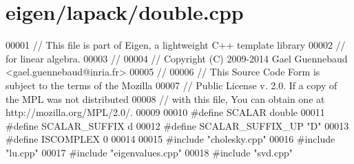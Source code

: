 \hypertarget{eigen_2lapack_2double_8cpp_source}{}\section{eigen/lapack/double.cpp}
\label{eigen_2lapack_2double_8cpp_source}

\begin{DoxyCode}
00001 \textcolor{comment}{// This file is part of Eigen, a lightweight C++ template library}
00002 \textcolor{comment}{// for linear algebra.}
00003 \textcolor{comment}{//}
00004 \textcolor{comment}{// Copyright (C) 2009-2014 Gael Guennebaud <gael.guennebaud@inria.fr>}
00005 \textcolor{comment}{//}
00006 \textcolor{comment}{// This Source Code Form is subject to the terms of the Mozilla}
00007 \textcolor{comment}{// Public License v. 2.0. If a copy of the MPL was not distributed}
00008 \textcolor{comment}{// with this file, You can obtain one at http://mozilla.org/MPL/2.0/.}
00009 
00010 \textcolor{preprocessor}{#define SCALAR        double}
00011 \textcolor{preprocessor}{#define SCALAR\_SUFFIX d}
00012 \textcolor{preprocessor}{#define SCALAR\_SUFFIX\_UP "D"}
00013 \textcolor{preprocessor}{#define ISCOMPLEX     0}
00014 
00015 \textcolor{preprocessor}{#include "cholesky.cpp"}
00016 \textcolor{preprocessor}{#include "lu.cpp"}
00017 \textcolor{preprocessor}{#include "eigenvalues.cpp"}
00018 \textcolor{preprocessor}{#include "svd.cpp"}
\end{DoxyCode}
